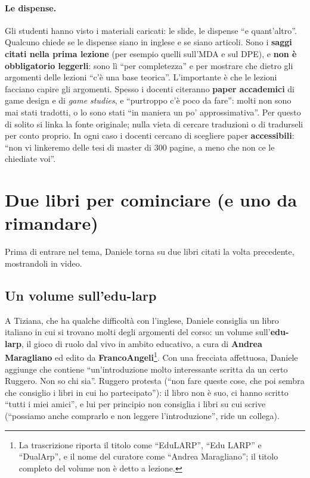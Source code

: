 \paragraph{Le dispense.} Gli studenti hanno visto i materiali caricati: le
slide, le dispense ``e quant'altro''. Qualcuno chiede se le dispense siano in
inglese e se siano articoli. Sono i \textbf{saggi citati nella prima lezione}
(per esempio quelli sull'MDA e sul DPE), e \textbf{non è obbligatorio leggerli}:
sono lì ``per completezza'' e per mostrare che dietro gli argomenti delle
lezioni ``c'è una base teorica''. L'importante è che le lezioni facciano capire
gli argomenti. Spesso i docenti citeranno \textbf{paper accademici} di game
design e di \emph{game studies}, e ``purtroppo c'è poco da fare'': molti non sono
mai stati tradotti, o lo sono stati ``in maniera un po' approssimativa''. Per
questo di solito si linka la fonte originale; nulla vieta di cercare traduzioni
o di tradurseli per conto proprio. In ogni caso i docenti cercano di scegliere
paper \textbf{accessibili}: ``non vi linkeremo delle tesi di master di 300
pagine, a meno che non ce le chiediate voi''.

\section{Due libri per cominciare (e uno da rimandare)}
\label{a2:sec:libri}

Prima di entrare nel tema, Daniele torna su due libri citati la volta
precedente, mostrandoli in video.

\subsection{Un volume sull'edu-larp}

A Tiziana, che ha qualche difficoltà con l'inglese, Daniele consiglia un libro
italiano in cui si trovano molti degli argomenti del corso: un volume
sull'\textbf{edu-larp}, il gioco di ruolo dal vivo in ambito educativo, a cura
di \textbf{Andrea Maragliano} ed edito da \textbf{FrancoAngeli}\footnote{La
trascrizione riporta il titolo come ``EduLARP'', ``Edu LARP'' e ``DualArp'', e
il nome del curatore come ``Andrea Maragliano''; il titolo completo del volume
non è detto a lezione.}. Con una frecciata affettuosa, Daniele aggiunge che
contiene ``un'introduzione molto interessante scritta da un certo Ruggero. Non
so chi sia''. Ruggero protesta (``non fare queste cose, che poi sembra che
consiglio i libri in cui ho partecipato''): il libro non è suo, ci hanno scritto
``tutti i miei amici'', e lui per principio non consiglia i libri su cui scrive
(``possiamo anche comprarlo e non leggere l'introduzione'', ride un collega).

